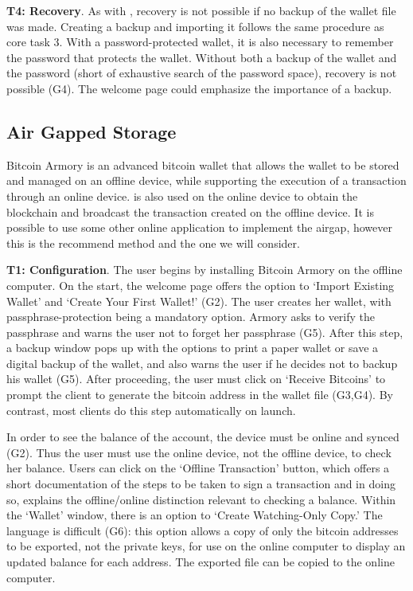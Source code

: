 \textbf{T4: Recovery}.
As with \bitcoinclient, recovery is not possible if no backup of the wallet file was made. Creating a backup and importing it follows the same procedure as core task 3. With a password-protected wallet, it is also necessary to remember the password that protects the wallet. Without both a backup of the wallet and the password (short of exhaustive search of the password space), recovery is not possible (G4). The welcome page could emphasize the importance of a backup. 

\subsection{Air Gapped Storage}
\label{air gap}
Bitcoin Armory is an advanced bitcoin wallet that allows the wallet to be stored and managed on an offline device, while supporting the execution of a transaction through an online device. \armory is also used on the online device to obtain the blockchain and broadcast the transaction created on the offline device. It is possible to use some other online application to implement the airgap, however this is the recommend method and the one we will consider.

\textbf{T1: Configuration}.
The user begins by installing Bitcoin Armory on the offline computer. On the start, the welcome page offers the option to `Import Existing Wallet' and `Create Your First Wallet!' (G2). The user creates her wallet, with passphrase-protection being a mandatory option. Armory asks to verify the passphrase and warns the user not to forget her passphrase (G5). After this step, a backup window pops up with the options to print a paper wallet or save a digital backup of the wallet, and also warns the user if he decides not to backup his wallet (G5). After proceeding, the user must click on `Receive Bitcoins' to prompt the client to generate the bitcoin address in the wallet file (G3,G4). By contrast, most clients do this step automatically on launch. 

In order to see the balance of the account, the device must be online and synced (G2). Thus the user must use the online device, not the offline device, to check her balance. Users can click on the `Offline Transaction' button, which offers a short documentation of the steps to be taken to sign a transaction and in doing so, explains the offline/online distinction relevant to checking a balance. Within the `Wallet' window, there is an option to `Create Watching-Only Copy.' The language is difficult (G6): this option allows a copy of only the bitcoin addresses to be exported, not the private keys, for use on the online computer to display an updated balance for each address. The exported file can be copied to the online computer.

